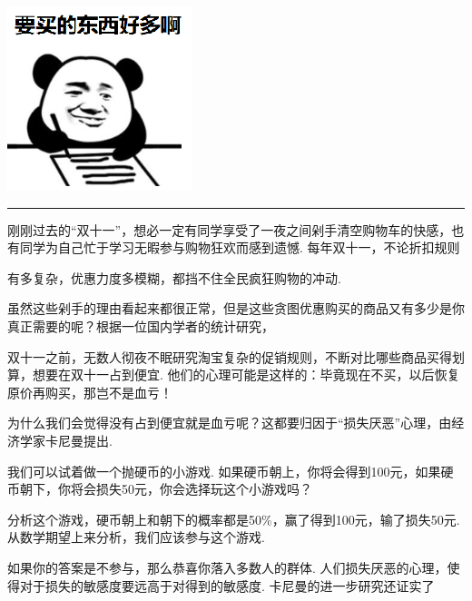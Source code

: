 \newpage
{}
\begin{multicols}{2}

\noindent\includegraphics[width=0.5\linewidth]{IMG/201911/image10.png}
\hfill
\begin{minipage}[b]{0.48\linewidth}
\rule{2em}{0em}刚刚过去的“双十一”，想必一定有同学享受了一夜之间剁手清空购物车的快感，也有同学为自己忙于学习无暇参与购物狂欢而感到遗憾. 每年双十一，不论折扣规则
\end{minipage}

\noindent 有多复杂，优惠力度多模糊，都挡不住全民疯狂购物的冲动. 

虽然这些剁手的理由看起来都很正常，但是这些贪图优惠购买的商品又有多少是你真正需要的呢？根据一位国内学者的统计研究，

双十一之前，无数人彻夜不眠研究淘宝复杂的促销规则，不断对比哪些商品买得划算，想要在双十一占到便宜. 他们的心理可能是这样的：毕竟现在不买，以后恢复原价再购买，那岂不是血亏！

为什么我们会觉得没有占到便宜就是血亏呢？这都要归因于“损失厌恶”心理，由经济学家卡尼曼提出. 

我们可以试着做一个抛硬币的小游戏. 如果硬币朝上，你将会得到100元，如果硬币朝下，你将会损失50元，你会选择玩这个小游戏吗？

分析这个游戏，硬币朝上和朝下的概率都是50\%，赢了得到100元，输了损失50元. 从数学期望上来分析，我们应该参与这个游戏. 

如果你的答案是不参与，那么恭喜你落入多数人的群体. 人们损失厌恶的心理，使得对于损失的敏感度要远高于对得到的敏感度. 卡尼曼的进一步研究还证实了




\end{multicols}
